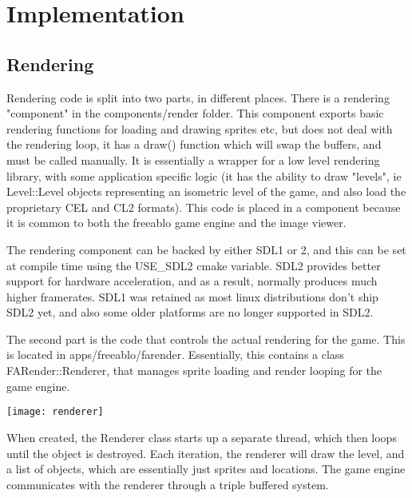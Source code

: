 \chapter{Implementation}

 \section{Rendering}  
    Rendering code is split into two parts, in different places. There is a rendering "component" in the components/render folder.
    This component exports basic rendering functions for loading and drawing sprites etc, but does not deal with the rendering loop, it has a draw() function which will swap the buffers, and must be called manually.   
    It is essentially a wrapper for a low level rendering library, with some application specific logic (it has the ability to draw "levels", ie Level::Level objects representing an isometric level of the game, and also load the proprietary CEL and CL2 formats).
    This code is placed in a component because it is common to both the freeablo game engine and the image viewer.
    
    The rendering component can be backed by either SDL1 or 2, and this can be set at compile time using the USE\_SDL2 cmake variable. SDL2 provides better support for hardware acceleration, and as a result, normally produces much higher framerates. SDL1 was retained as most linux distributions don't ship SDL2 yet, and also some older platforms are no longer supported in SDL2.
    
    \mbox{}
    
    The second part is the code that controls the actual rendering for the game. This is located in apps/freeablo/farender. Essentially, this contains a class FARender::Renderer, that manages sprite loading and render looping for the game engine.
    
    \begin{center}\texttt{[image: renderer]}\end{center}
      
    When created, the Renderer class starts up a separate thread, which then loops until the object is destroyed. Each iteration, the renderer will draw the level, and a list of objects, which are essentially just sprites and locations.
    The game engine communicates with the renderer through a triple buffered system.
    
